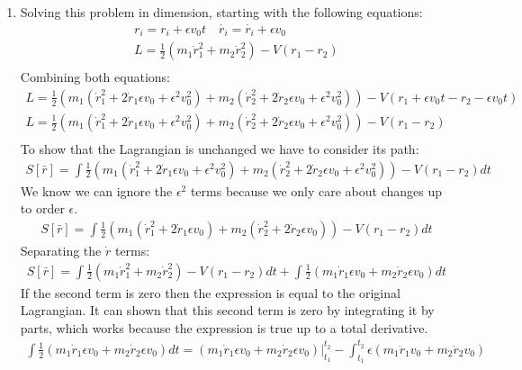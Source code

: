 \documentclass[12pt]{article}
\begin{document}
\begin{enumerate}
    \item Solving this problem in dimension, starting with the following equations:
    \begin{gather}
      r_i=r_i+\epsilon v_0 t\quad\dot{r_i}=\dot{r_i}+\epsilon v_0\\
      L=\frac{1}{2}\left(m_1 \dot{r}_1^2+m_2 \dot{r}_2^2\right)-V(r_1-r_2)\\
    \end{gather}
    Combining both equations:
    \begin{gather}
      L=\frac{1}{2}\left(m_1 \left(\dot{r}_1^2+2\dot{r}_1\epsilon v_0 +\epsilon^2 v_0^2\right)+m_2 \left(\dot{r}_2^2+2\dot{r}_2\epsilon v_0+ \epsilon^2 v_0^2\right)\right)-V(r_1+\epsilon v_0 t-r_2-\epsilon v_0 t)\\
      L=\frac{1}{2}\left(m_1 \left(\dot{r}_1^2+2\dot{r}_1\epsilon v_0 +\epsilon^2 v_0^2\right)+m_2 \left(\dot{r}_2^2+2\dot{r}_2\epsilon v_0+ \epsilon^2 v_0^2\right)\right)-V(r_1-r_2)\\
    \end{gather}
    To show that the Lagrangian is unchanged we have to consider its path:
    \begin{gather}
      S[\bar{r}]=\int \frac{1}{2}\left(m_1 \left(\dot{r}_1^2+2\dot{r}_1\epsilon v_0 +\epsilon^2 v_0^2\right)+m_2 \left(\dot{r}_2^2+2\dot{r}_2\epsilon v_0+ \epsilon^2 v_0^2\right)\right)-V(r_1-r_2)dt
    \end{gather}
    We know we can ignore the $\epsilon^2$ terms because we only care about changes up to order $\epsilon$.
    \begin{gather}
      S[\bar{r}]=\int \frac{1}{2}\left(m_1 \left(\dot{r}_1^2+2\dot{r}_1\epsilon v_0\right)+m_2 \left(\dot{r}_2^2+2\dot{r}_2\epsilon v_0\right)\right)-V(r_1-r_2)dt
    \end{gather}
    Separating the $\dot{r}$ terms:
    \begin{gather}
      S[\bar{r}]=\int \frac{1}{2}\left(m_1 \dot{r}_1^2+m_2 \dot{r}_2^2\right)-V(r_1-r_2)dt+\int \frac{1}{2}\left(m_1 \dot{r}_1\epsilon v_0+m_2 \dot{r}_2\epsilon v_0\right)dt
    \end{gather}
    If the second term is zero then the expression is equal to the original Lagrangian.
    It can shown that this second term is zero by integrating it by parts, which works because the expression is true up to a total derivative.
    \begin{gather}
      \int \frac{1}{2}\left(m_1 \dot{r}_1\epsilon v_0+m_2 \dot{r}_2\epsilon v_0\right)dt=\left.\left(m_1 \dot{r}_1\epsilon v_0+m_2 \dot{r}_2\epsilon v_0\right)\right|_{t_1}^{t_2}-\int_{t_1}^{t_2}\epsilon\left(m_1 \ddot{r}_1 v_0+m_2 \ddot{r}_2 v_0\right)

\end{gather}
\end{enumerate}
\end{document}
